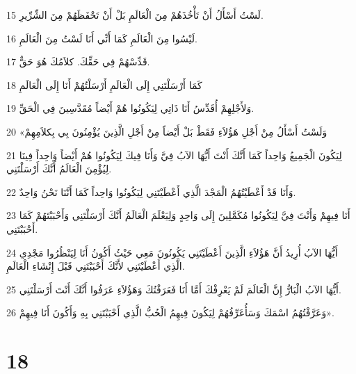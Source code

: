 \par 15 لَسْتُ أَسْأَلُ أَنْ تَأْخُذَهُمْ مِنَ الْعَالَمِ بَلْ أَنْ تَحْفَظَهُمْ مِنَ الشِّرِّيرِ.
\par 16 لَيْسُوا مِنَ الْعَالَمِ كَمَا أَنِّي أَنَا لَسْتُ مِنَ الْعَالَمِ.
\par 17 قَدِّسْهُمْ فِي حَقِّكَ. كلاَمُكَ هُوَ حَقٌّ.
\par 18 كَمَا أَرْسَلْتَنِي إِلَى الْعَالَمِ أَرْسَلْتُهُمْ أَنَا إِلَى الْعَالَمِ
\par 19 وَلأَجْلِهِمْ أُقَدِّسُ أَنَا ذَاتِي لِيَكُونُوا هُمْ أَيْضاً مُقَدَّسِينَ فِي الْحَقِّ.
\par 20 «وَلَسْتُ أَسْأَلُ مِنْ أَجْلِ هَؤُلاَءِ فَقَطْ بَلْ أَيْضاً مِنْ أَجْلِ الَّذِينَ يُؤْمِنُونَ بِي بِكلاَمِهِمْ
\par 21 لِيَكُونَ الْجَمِيعُ وَاحِداً كَمَا أَنَّكَ أَنْتَ أَيُّهَا الآبُ فِيَّ وَأَنَا فِيكَ لِيَكُونُوا هُمْ أَيْضاً وَاحِداً فِينَا لِيُؤْمِنَ الْعَالَمُ أَنَّكَ أَرْسَلْتَنِي.
\par 22 وَأَنَا قَدْ أَعْطَيْتُهُمُ الْمَجْدَ الَّذِي أَعْطَيْتَنِي لِيَكُونُوا وَاحِداً كَمَا أَنَّنَا نَحْنُ وَاحِدٌ.
\par 23 أَنَا فِيهِمْ وَأَنْتَ فِيَّ لِيَكُونُوا مُكَمَّلِينَ إِلَى وَاحِدٍ وَلِيَعْلَمَ الْعَالَمُ أَنَّكَ أَرْسَلْتَنِي وَأَحْبَبْتَهُمْ كَمَا أَحْبَبْتَنِي.
\par 24 أَيُّهَا الآبُ أُرِيدُ أَنَّ هَؤُلاَءِ الَّذِينَ أَعْطَيْتَنِي يَكُونُونَ مَعِي حَيْثُ أَكُونُ أَنَا لِيَنْظُرُوا مَجْدِي الَّذِي أَعْطَيْتَنِي لأَنَّكَ أَحْبَبْتَنِي قَبْلَ إِنْشَاءِ الْعَالَمِ.
\par 25 أَيُّهَا الآبُ الْبَارُّ إِنَّ الْعَالَمَ لَمْ يَعْرِفْكَ أَمَّا أَنَا فَعَرَفْتُكَ وَهَؤُلاَءِ عَرَفُوا أَنَّكَ أَنْتَ أَرْسَلْتَنِي.
\par 26 وَعَرَّفْتُهُمُ اسْمَكَ وَسَأُعَرِّفُهُمْ لِيَكُونَ فِيهِمُ الْحُبُّ الَّذِي أَحْبَبْتَنِي بِهِ وَأَكُونَ أَنَا فِيهِمْ».

\chapter{18}

